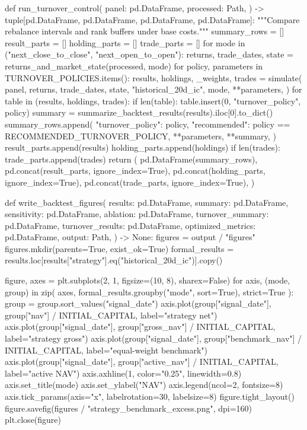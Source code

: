 \documentclass[UTF8,a4paper,fontset=fandol]{ctexart}
\begin{document}
\begin{ProjectCode}
def run_turnover_control(
    panel: pd.DataFrame,
    processed: Path,
) -> tuple[pd.DataFrame, pd.DataFrame, pd.DataFrame, pd.DataFrame]:
    """Compare rebalance intervals and rank buffers under base costs."""
    summary_rows = []
    result_parts = []
    holding_parts = []
    trade_parts = []
    for mode in ("next_close_to_close", "next_open_to_open"):
        returns, trade_dates, state = returns_and_market_state(processed, mode)
        for policy, parameters in TURNOVER_POLICIES.items():
            results, holdings, _weights, trades = simulate(
                panel,
                returns,
                trade_dates,
                state,
                "historical_20d_ic",
                mode,
                **parameters,
            )
            for table in (results, holdings, trades):
                if len(table):
                    table.insert(0, "turnover_policy", policy)
            summary = summarize_backtest_results(results).iloc[0].to_dict()
            summary_rows.append({
                "turnover_policy": policy,
                "recommended": policy == RECOMMENDED_TURNOVER_POLICY,
                **parameters,
                **summary,
            })
            result_parts.append(results)
            holding_parts.append(holdings)
            if len(trades):
                trade_parts.append(trades)
    return (
        pd.DataFrame(summary_rows),
        pd.concat(result_parts, ignore_index=True),
        pd.concat(holding_parts, ignore_index=True),
        pd.concat(trade_parts, ignore_index=True),
    )


def write_backtest_figures(
    results: pd.DataFrame,
    summary: pd.DataFrame,
    sensitivity: pd.DataFrame,
    ablation: pd.DataFrame,
    turnover_summary: pd.DataFrame,
    turnover_results: pd.DataFrame,
    optimized_metrics: pd.DataFrame,
    output: Path,
) -> None:
    figures = output / "figures"
    figures.mkdir(parents=True, exist_ok=True)
    formal_results = results.loc[results["strategy"].eq("historical_20d_ic")].copy()

    figure, axes = plt.subplots(2, 1, figsize=(10, 8), sharex=False)
    for axis, (mode, group) in zip(
        axes, formal_results.groupby("mode", sort=True), strict=True
    ):
        group = group.sort_values("signal_date")
        axis.plot(group["signal_date"], group["nav"] / INITIAL_CAPITAL, label="strategy net")
        axis.plot(group["signal_date"], group["gross_nav"] / INITIAL_CAPITAL, label="strategy gross")
        axis.plot(group["signal_date"], group["benchmark_nav"] / INITIAL_CAPITAL, label="equal-weight benchmark")
        axis.plot(group["signal_date"], group["active_nav"] / INITIAL_CAPITAL, label="active NAV")
        axis.axhline(1, color="0.25", linewidth=0.8)
        axis.set_title(mode)
        axis.set_ylabel("NAV")
        axis.legend(ncol=2, fontsize=8)
        axis.tick_params(axis="x", labelrotation=30, labelsize=8)
    figure.tight_layout()
    figure.savefig(figures / "strategy_benchmark_excess.png", dpi=160)
    plt.close(figure)


\end{ProjectCode}
\end{document}

